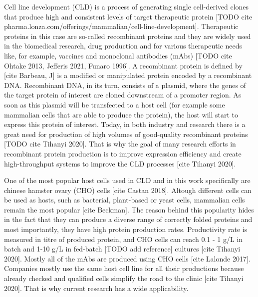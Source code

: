 Cell line development (CLD) is a process of generating single cell-derived clones that produce high and consistent levels of target therapeutic protein [TODO cite pharma.lonza.com/offerings/mammalian/cell-line-development]. Therapeutic proteins in this case are so-called recombinant proteins and they are widely used in the biomedical research, drug production and for various therapeutic needs like, for example, vaccines and monoclonal antibodies (mAbs) \cite[see]{IWNLP} \supercite{iqbal2007underwater} [TODO cite Ohtake 2013, Jefferis 2021, Funaro 1996]. A recombinant protein is defined by [cite Barbeau, J] is a modified or manipulated protein encoded by a recombinant DNA. Recombinant DNA, in its turn, consists of a plasmid, where the genes of the target protein of interest are cloned downstream of a promoter region. As soon as this plasmid will be transfected to a host cell (for example some mammalian cells that are able to produce the protein), the host will start to express this protein of interest. Today, in both industry and research there is a great need for production of high volumes of good-quality recombinant proteins [TODO cite Tihanyi 2020]. That is why the goal of many research efforts in recombinant protein production is to improve expression efficiency and create high-throughput systems to improve the CLD processes [cite Tihanyi 2020].


One of the most popular host cells used in CLD and in this work specifically are chinese hamster ovary (CHO) cells [cite Castan 2018]. Altough different cells can be used as hosts, such as bacterial, plant-based or yeast cells, mammalian cells remain the most popular [cite Beckman]. The reason behind this popularity hides in the fact that they can produce a diverse range of correctly folded proteins and most importantly, they have high protein production rates. Productivity rate is measured in titre of produced protein, and CHO cells can reach 0.1 - 1 g/L in batch and 1-10 g/L in fed-batch [TODO add reference] cultures [cite Tihanyi 2020]. Mostly all of the mAbs are produced using CHO cells [cite Lalonde 2017]. Companies mostly use the same host cell line for all their productions because already checked and qualified cells simplify the road to the clinic [cite Tihanyi 2020]. That is why current research has a wide applicability.

